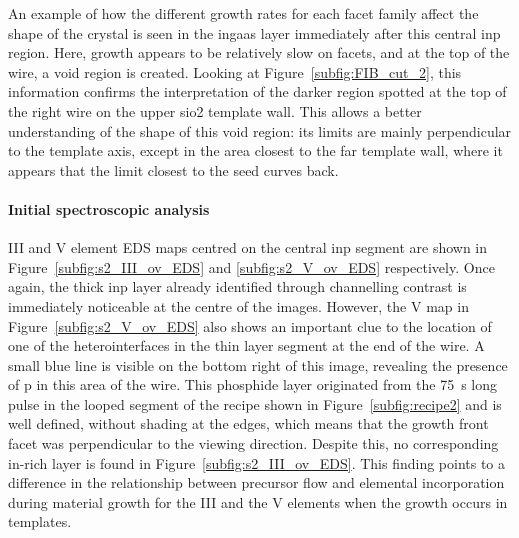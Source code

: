 An example of how the different growth rates for each facet family affect the shape of the crystal is seen in the \acs{ingaas} layer immediately after this central \acs{inp} region. Here, growth appears to be relatively slow on  facets, and at the top of the wire, a void region is created. Looking at Figure~\ref{subfig:FIB_cut_2}, this information confirms the interpretation of the darker region spotted at the top of the right wire on the upper \acs{sio2} template wall. This allows a better understanding of the shape of this void region: its limits are mainly perpendicular to the template axis, except in the area closest to the far template wall, where it appears that the limit closest to the seed curves back.
\par
\paragraph{Initial spectroscopic analysis} III and V element EDS maps centred on the central \acs{inp} segment are shown in Figure~\ref{subfig:s2_III_ov_EDS} and \ref{subfig:s2_V_ov_EDS} respectively. Once again, the thick \acs{inp} layer already identified through channelling contrast is immediately noticeable at the centre of the images. However, the V map in Figure~\ref{subfig:s2_V_ov_EDS} also shows an important clue to the location of one of the heterointerfaces in the thin layer segment at the end of the wire. A small blue line is visible on the bottom right of this image, revealing the presence of \acl{p} in this area of the wire. This phosphide layer originated from the \qty{75}{\second} long pulse in the looped segment of the recipe shown in Figure~\ref{subfig:recipe2} and is well defined, without shading at the edges, which means that the growth front facet was perpendicular to the viewing direction. Despite this, no corresponding \acs{in}-rich layer is found in Figure~\ref{subfig:s2_III_ov_EDS}. This finding points to a difference in the relationship between precursor flow and elemental incorporation during material growth for the III and the V elements when the growth occurs in templates.
\par


